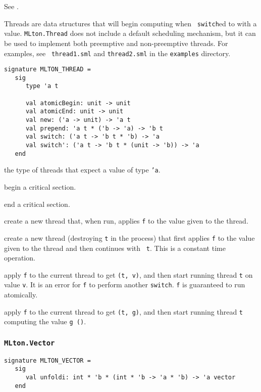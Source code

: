 See .

Threads are data structures that will begin computing when {\tt
switch}ed to with a value.  {\tt MLton.Thread} does not include a
default scheduling mechanism, but it can be used to implement both
preemptive and non-preemptive threads.  For examples, see {\tt
thread1.sml} and {\tt thread2.sml} in the {\tt examples} directory.
\begin{verbatim}
signature MLTON_THREAD =
   sig
      type 'a t

      val atomicBegin: unit -> unit
      val atomicEnd: unit -> unit
      val new: ('a -> unit) -> 'a t
      val prepend: 'a t * ('b -> 'a) -> 'b t
      val switch: ('a t -> 'b t * 'b) -> 'a
      val switch': ('a t -> 'b t * (unit -> 'b)) -> 'a
   end
\end{verbatim}

\begin{description}

the type of threads that expect a value of type {\tt 'a}.

begin a critical section.

end a critical section.

create a new thread that, when run, applies {\tt f} to the
value given to the thread. 

create a new thread (destroying {\tt t} in the process) that first applies
{\tt f} to the value given to the thread and then continues with {\tt
t}.  This is a constant time operation.

apply {\tt f} to the current thread to get {\tt (t, v)}, and then
start running thread {\tt t} on value {\tt v}.  It is an error for
{\tt f} to perform another {\tt switch}.  {\tt f} is guaranteed
to run atomically.

apply {\tt f} to the current thread to get {\tt (t, g)}, and then
start running thread {\tt t} computing the value {\tt g ()}.

\end{description}

\subsubsection{\tt MLton.Vector}
\begin{verbatim}
signature MLTON_VECTOR =
   sig
      val unfoldi: int * 'b * (int * 'b -> 'a * 'b) -> 'a vector
   end
\end{verbatim}

